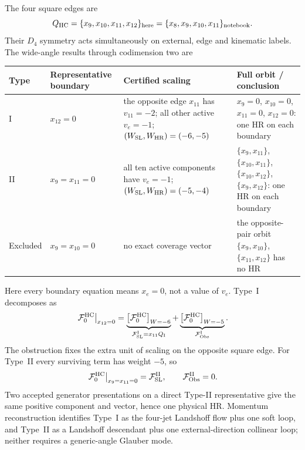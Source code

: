 \documentclass[a4paper,11pt]{article}
\newcommand{\WSL}{W_{\rm SL}}
\newcommand{\WHR}{W_{\rm HR}}
\begin{document}
The four square edges are
\begin{equation}
 Q_{\rm HC}=\{x_9,x_{10},x_{11},x_{12}\}_{\rm here}
 =\{x_8,x_9,x_{10},x_{11}\}_{\rm notebook}.
\end{equation}
Their \(D_4\) symmetry acts simultaneously on external, edge and kinematic
labels.  The wide-angle results through codimension two are
\begin{center}
\small
\begin{tabular}{@{}
 >{\raggedright\arraybackslash}p{}
 >{\raggedright\arraybackslash}p{}
 >{\raggedright\arraybackslash}p{}
 >{\raggedright\arraybackslash}p{}@{}}
\toprule
Type & Representative boundary & Certified scaling & Full orbit / conclusion\\
\midrule
I & \(x_{12}=0\) & the opposite edge \(x_{11}\) has \(v_{11}=-2\);
all other active \(v_e=-1\); \((\WSL,\WHR)=(-6,-5)\)
& \(x_9=0\), \(x_{10}=0\), \(x_{11}=0\), \(x_{12}=0\): one HR on each boundary\\[1mm]
II & \(x_9=x_{11}=0\) & all ten active components have \(v_e=-1\);
\((\WSL,\WHR)=(-5,-4)\)
& \(\{x_9,x_{11}\}\), \(\{x_{10},x_{11}\}\),
\(\{x_{10},x_{12}\}\), \(\{x_9,x_{12}\}\): one HR on each boundary\\[1mm]
Excluded & \(x_9=x_{10}=0\) & no exact coverage vector & the opposite-pair
orbit \(\{x_9,x_{10}\}\), \(\{x_{11},x_{12}\}\) has no HR\\
\bottomrule
\end{tabular}
\end{center}
Here every boundary equation means \(x_e=0\), not a value of \(v_e\).
Type~I decomposes as
\begin{equation}
 \left.\mathcal F_0^{\rm HC}\right|_{x_{12}=0}
 =\underbrace{\left[\mathcal F_0^{\rm HC}\right]_{W=-6}}_
   {\mathcal F_{\rm SL}^{\rm I}=x_{11}Q_{\rm I}}
 +\underbrace{\left[\mathcal F_0^{\rm HC}\right]_{W=-5}}_
   {\mathcal F_{\rm Obs}^{\rm I}}.
 \label{eq:HC-type-I-decomposition}
\end{equation}
The obstruction fixes the extra unit of scaling on the opposite square edge.
For Type~II every surviving term has weight \(-5\), so
\begin{equation}
 \left.\mathcal F_0^{\rm HC}\right|_{x_9=x_{11}=0}
 =\mathcal F_{\rm SL}^{\rm II},
 \qquad \mathcal F_{\rm Obs}^{\rm II}=0.
\end{equation}
Two accepted generator presentations on a direct Type-II representative give
the same positive component and vector, hence one physical HR.  Momentum
reconstruction identifies Type~I as the four-jet Landshoff flow plus one soft
loop, and Type~II as a Landshoff descendant plus one external-direction
collinear loop; neither requires a generic-angle Glauber mode.
\end{document}
